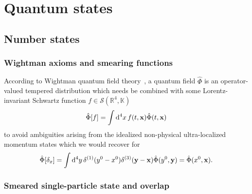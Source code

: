 \section{Quantum states}

\subsection{Number states}

\subsubsection{Wightman axioms and smearing functions}

According to Wightman quantum field theory~\cite[p.~324]{Bogolubov1989}, a quantum field $\hat\Phi$ is an operator-valued tempered distribution which needs be combined with some Lorentz-invariant Schwartz function $f\in\mathcal{S}(\mathbb{R}^4,\mathbb{K})$
\begin{equation}
	\hat\Phi[f]
	=
	\int\dd[4]{x}
	f(t,\vb{x})
	\hat\Phi(t,\vb{x})
\end{equation}
to avoid ambiguities arising from the idealized non-physical ultra-localized momentum states which we would recover for
\begin{equation}
	\hat\Phi[\delta_x]
	=
	\int\dd[4]{y}
	\delta^{(1)}(y^0-x^0)
	\delta^{(3)}(\vb{y}-\vb{x})
	\hat\Phi(y^0,\vb{y})
	=
	\hat\Phi(x^0,\vb{x})
	.
\end{equation}

\subsubsection{Smeared single-particle state and overlap}

